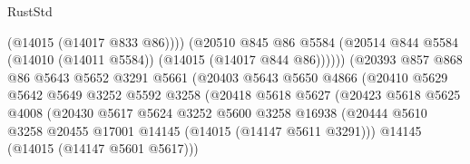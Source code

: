 \begin{lexlean}{RustStd}
\begin{coremodule}
                                          (@14015 (@14017 @833 @86))))
                                      (@20510
                                        @845
                                        @86
                                        @5584
                                        (@20514
                                          @844
                                          @5584
                                          (@14010 (@14011 @5584))
                                          (@14015 (@14017 @844 @86))))))
                                  (@20393
                                    @857
                                    @868
                                    @86
                                    @5643
                                    @5652
                                    @3291
                                    @5661
                                    (@20403
                                      @5643
                                      @5650
                                      @4866
                                      (@20410
                                        @5629
                                        @5642
                                        @5649
                                        @3252
                                        @5592
                                        @3258
                                        (@20418
                                          @5618
                                          @5627
                                          (@20423
                                            @5618
                                            @5625
                                            @4008
                                            (@20430
                                              @5617
                                              @5624
                                              @3252
                                              @5600
                                              @3258
                                              @16938
                                              (@20444
                                                @5610
                                                @3258
                                                @20455
                                                @17001
                                                @14145
                                                (@14015 (@14147 @5611 @3291)))
                                              @14145
                                              (@14015 (@14147 @5601 @5617)))

\end{coremodule}
\end{lexlean}
